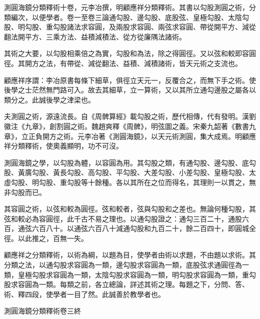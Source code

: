 \documentclass[11pt,a4paper]{article}
\begin{document}
測圓海鏡分類釋術十卷，元李冶撰，明顧應祥分類釋術。其書以勾股測圓之術，分類編次，以便學者。卷一至卷三論通勾股、邊勾股、底股弦、皇極勾股、太陰勾股、明勾股、重勾股諸法求容圓，及兩股求容圓、兩弦求容圓、帶從開平方、減從翻法開平方、三乘方法、益積減積法、從方從廉隅法諸術。

其術之大要，以勾股相乘倍之為實，勾股和為法，除之得圓徑。又以弦和較即容圓徑。其開方之法，有帶從、減從翻法、益積、減積諸術，皆天元術之支流也。

顧應祥序謂：李冶原書每條下細草，俱徑立天元一，反覆合之，而無下手之術。使後學之士茫然無門路可入。故去其細草，立一算術，又以其所立通勾邊股之屬各以類分之。此誠後學之津梁也。

夫測圓之術，源遠流長。自《周髀算經》載勾股之術，歷代相傳，代有發明。漢劉徽注《九章》，創割圓之術。魏趙爽釋《周髀》，明弦圖之義。宋秦九韶著《數書九章》，立正負開方之術。元李冶著《測圓海鏡》，以天元術測圓，集大成焉。明顧應祥分類釋術，使奧義顯明，功不可沒。

測圓海鏡之學，以勾股為體，以容圓為用。其勾股之類，有通勾股、邊勾股、底勾股、黃廣勾股、黃長勾股、高勾股、平勾股、大差勾股、小差勾股、皇極勾股、太虛勾股、明勾股、重勾股等十餘種。各以其所在之位而得名，其理則一以貫之，無非勾股而已。

其容圓之術，以弦和較為圓徑。弦和較者，弦與勾股和之差也。無論何種勾股，其弦和較必為容圓徑，此千古不易之理也。以通勾股證之：通勾三百二十，通股六百，通弦六百八十。以通弦六百八十減通勾股和九百二十，餘二百四十，即圓城全徑。以此推之，百無一失。

顧應祥之分類釋術，以術為綱，以題為目，使學者由術以求題，不由題以求術。其分類之法，以通勾股求容圓為一類，邊勾股求容圓為一類，底股弦求通圓徑為一類，皇極勾股求容圓為一類，太陰勾股求容圓為一類，明勾股求容圓為一類，重勾股求容圓為一類。每類之前，各立總論，詳述其術之理。每題之下，分問、答、術、釋四段，使學者一目了然。此誠善於教學者也。

\bigskip
\begin{flushright}
測圓海鏡分類釋術卷三終
\end{flushright}

\clearpage
\end{document}
